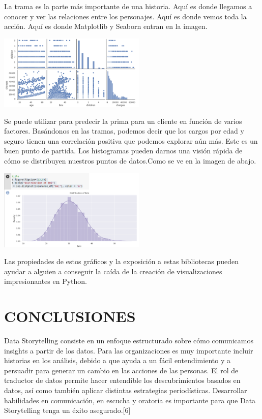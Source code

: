 \documentclass[twoside,twocolumn]{article}
\begin{document}
La trama es la parte más importante de una historia. Aquí es donde llegamos a conocer y ver las relaciones entre los personajes. Aquí es donde vemos toda la acción. 
Aquí es donde Matplotlib y Seaborn entran en la imagen.
\begin{center}
	\includegraphics[width=7cm]{./imagenes/p4.png} 
\end{center}

Se puede utilizar para predecir la prima para un cliente en función de varios factores. Basándonos en las tramas, podemos decir que los cargos por edad y seguro tienen una correlación positiva que podemos explorar aún más. Este es un buen punto de partida.
Los histogramas pueden darnos una visión rápida de cómo se distribuyen nuestros puntos de datos.Como se ve en la imagen de abajo.
\begin{center}
	\includegraphics[width=7cm]{./imagenes/p5.png} 
\end{center}
Las propiedades de estos gráficos y la exposición a estas bibliotecas pueden ayudar a alguien a conseguir la caída de la creación de visualizaciones impresionantes en Python.

  \section{CONCLUSIONES}
  Data Storytelling consiste 
  en un enfoque estructurado sobre cómo comunicamos
   insights a partir de los datos. Para las organizaciones
	es muy importante incluir historias en los análisis, 
	debido a que ayuda a un fácil entendimiento y a persuadir 
	para generar un cambio en las acciones de las personas. 
	El rol de traductor de datos permite hacer entendible los 
	descubrimientos basados en datos, así como también aplicar
	 distintas estrategias periodísticas. Desarrollar habilidades en comunicación, en escucha y oratoria es importante para que
	  Data Storytelling tenga un éxito asegurado.[6]
\end{document}
